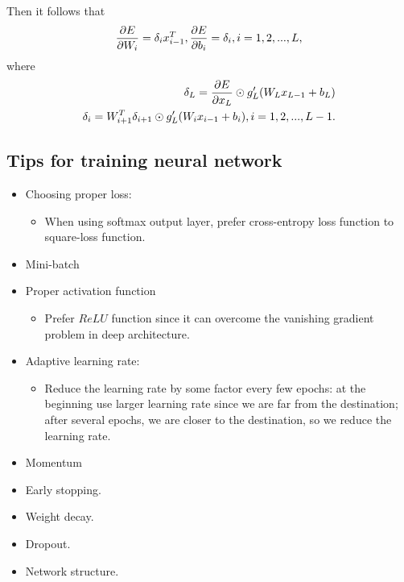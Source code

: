\begin{refsection}
\begin{theorem}
Then it follows that
$$\frac{\partial E}{\partial W_i} = \delta_i x_{i-1}^T, \frac{\partial E}{\partial b_i} = \delta_i, i=1,2,...,L, $$
where
\begin{align*}
\delta_L = \frac{\partial E}{\partial x_L}\odot g'_L(W_Lx_{L-1} +b_L) \\
\delta_i = W_{i+1}^T\delta_{i+1}\odot g'_L(W_ix_{i-1} +b_i), i=1,2,...,L-1.
\end{align*}
\end{theorem}

\subsection{Tips for training neural network}

\begin{remark}\hfill
\begin{itemize}
	\item Choosing proper loss:
	\begin{itemize}
		\item When using softmax output layer, prefer cross-entropy loss function to square-loss function.
		
	\end{itemize}
	\item Mini-batch
	\item Proper activation function
	\begin{itemize}
		\item Prefer $ReLU$ function since it can overcome the vanishing gradient problem in deep architecture.
	\end{itemize}
	\item Adaptive learning rate:
	\begin{itemize}
		\item Reduce the learning rate by some factor every few epochs: at the beginning use larger learning rate since we are far from the destination; after several epochs, we are closer to the destination, so we reduce the learning rate.
	\end{itemize}
	\item Momentum
\end{itemize}	
\end{remark}

\begin{remark}
\begin{itemize}
	\item Early stopping.
	\item Weight decay.
	\item Dropout.
	\item Network structure.
\end{itemize}	
	

\end{remark}
\end{refsection}
